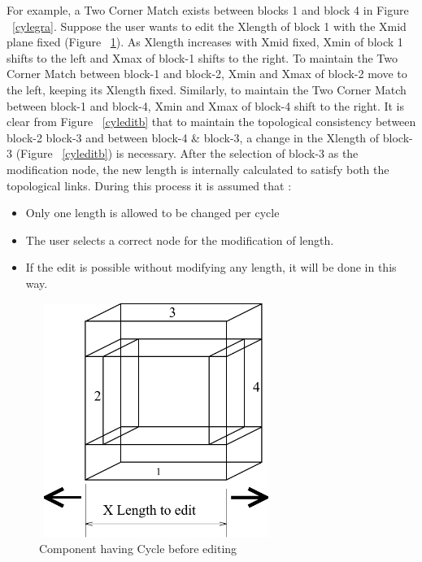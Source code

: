 \begin{itemize}
	For example, a Two Corner Match exists between blocks 1 and block 4 in 
	Figure
	~\ref{cylegra}. Suppose the user wants to edit the Xlength of block 1 
	with the Xmid plane fixed (Figure ~\ref{cyledita}). As Xlength increases 
	with Xmid fixed, Xmin of block 1 shifts to the left and Xmax of block-1 
	shifts to the right. To maintain the Two Corner Match between block-1 and 
	block-2, Xmin and Xmax of block-2
	move to the left, keeping its Xlength fixed. Similarly, to maintain the 
	Two Corner Match between block-1 and block-4, Xmin and Xmax of block-4 
	shift to 
	the right. It is clear from Figure ~\ref{cyleditb} that
	to maintain the topological consistency between block-2
	block-3 and between block-4 \& block-3, a change in the Xlength of 
	block-3 (Figure ~\ref{cyleditb}) is necessary. After the selection of 
	block-3
	as the modification node, the new length is internally calculated to
	satisfy both the topological links. During this process it is assumed that :

		\begin{itemize}
		\item
		Only one length is allowed to be changed per cycle
		\item
		The user selects a correct node for the modification of length.
		\item
		If the edit is possible without modifying any length, it
		will be done in this way.
		\end{itemize}

        \begin{figure}[htbp]
	\hspace{4cm}
	\includegraphics[width=3.0in,height=3.0in]{CYLEDITA.pdf}
            \caption{Component having Cycle before editing}
            \label{cyledita}
        \end{figure}
 

\end{itemize}
